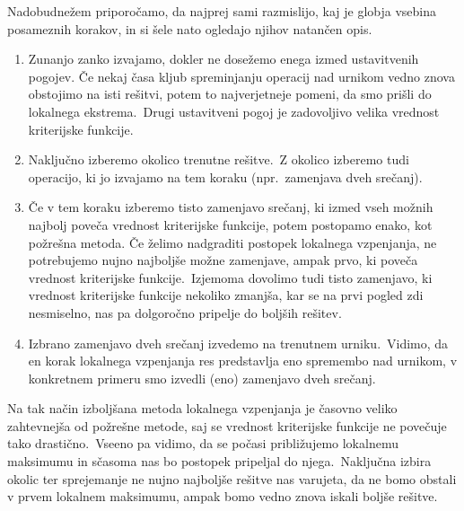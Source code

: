 \documentclass[a4paper]{article}
\begin{document}
\noindent
Nadobudnežem priporočamo, da najprej sami razmislijo, kaj je globja vsebina posameznih
korakov, in si šele nato ogledajo njihov natančen opis.

\begin{enumerate}
   \item Zunanjo zanko izvajamo, dokler ne dosežemo enega izmed ustavitvenih pogojev.
   Če nekaj časa kljub spreminjanju operacij nad urnikom vedno znova obstojimo na isti
   rešitvi, potem to najverjetneje pomeni, da smo prišli do lokalnega ekstrema.\ Drugi
   ustavitveni pogoj je zadovoljivo velika vrednost kriterijske funkcije.

   \item Naključno izberemo okolico trenutne rešitve.\ Z okolico izberemo tudi operacijo,
   ki jo izvajamo na tem koraku (npr.\ zamenjava dveh srečanj).

   \item Če v tem koraku izberemo tisto zamenjavo srečanj, ki izmed vseh možnih najbolj
   poveča vrednost kriterijske funkcije, potem postopamo enako, kot požrešna metoda. Če
   želimo nadgraditi postopek lokalnega vzpenjanja, ne potrebujemo nujno najboljše možne
   zamenjave, ampak prvo, ki poveča vrednost kriterijske funkcije.\ Izjemoma dovolimo tudi
   tisto zamenjavo, ki vrednost kriterijske funkcije nekoliko zmanjša, kar se na prvi
   pogled zdi nesmiselno, nas pa dolgoročno pripelje do boljših rešitev.

   \item Izbrano zamenjavo dveh srečanj izvedemo na trenutnem urniku.\ Vidimo, da en korak
   lokalnega vzpenjanja res predstavlja eno spremembo nad urnikom, v konkretnem primeru
   smo izvedli (eno) zamenjavo dveh srečanj.
\end{enumerate}

\noindent
Na tak način izboljšana metoda lokalnega vzpenjanja je časovno veliko zahtevnejša od
požrešne metode, saj se vrednost kriterijske funkcije ne povečuje tako drastično.\ Vseeno
pa vidimo, da se počasi približujemo lokalnemu maksimumu in sčasoma nas bo postopek
pripeljal do njega.\ Naključna izbira okolic ter sprejemanje ne nujno najboljše rešitve
nas varujeta, da ne bomo obstali v prvem lokalnem maksimumu, ampak bomo vedno znova
iskali boljše rešitve.
\end{document}
